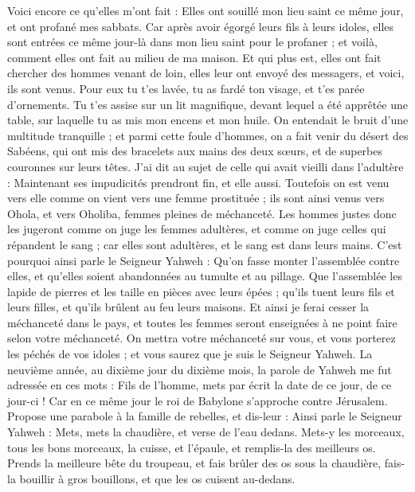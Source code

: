 \begin{multicols}{2}
Voici encore ce qu'elles m'ont fait : Elles ont souillé mon lieu saint ce même jour, et ont profané mes sabbats.
Car après avoir égorgé leurs fils à leurs idoles, elles sont entrées ce même jour-là dans mon lieu saint pour le profaner ; et voilà, comment elles ont fait au milieu de ma maison.
Et qui plus est, elles ont fait chercher des hommes venant de loin, elles leur ont envoyé des messagers, et voici, ils sont venus. Pour eux tu t'es lavée, tu as fardé ton visage, et t'es parée d'ornements.
Tu t'es assise sur un lit magnifique, devant lequel a été apprêtée une table, sur laquelle tu as mis mon encens et mon huile.
On entendait le bruit d’une multitude tranquille ; et parmi cette foule d’hommes, on a fait venir du désert des Sabéens, qui ont mis des bracelets aux mains des deux sœurs, et de superbes couronnes sur leurs têtes.
J'ai dit au sujet de celle qui avait vieilli dans l'adultère : Maintenant ses impudicités prendront fin, et elle aussi.
Toutefois on est venu vers elle comme on vient vers une femme prostituée ; ils sont ainsi venus vers Ohola, et vers Oholiba, femmes pleines de méchanceté.
Les hommes justes donc les jugeront comme on juge les femmes adultères, et comme on juge celles qui répandent le sang ; car elles sont adultères, et le sang est dans leurs mains.
C'est pourquoi ainsi parle le Seigneur Yahweh : Qu'on fasse monter l'assemblée contre elles, et qu'elles soient abandonnées au tumulte et au pillage.
Que l'assemblée les lapide de pierres et les taille en pièces avec leurs épées ; qu'ils tuent leurs fils et leurs filles, et qu'ils brûlent au feu leurs maisons.
Et ainsi je ferai cesser la méchanceté dans le pays, et toutes les femmes seront enseignées à ne point faire selon votre méchanceté.
On mettra votre méchanceté sur vous, et vous porterez les péchés de vos idoles ; et vous saurez que je suis le Seigneur Yahweh.
\VerseOne{}La neuvième année, au dixième jour du dixième mois, la parole de Yahweh me fut adressée en ces mots :
Fils de l’homme, mets par écrit la date de ce jour, de ce jour-ci ! Car en ce même jour le roi de Babylone s'approche contre Jérusalem.
Propose une parabole à la famille de rebelles, et dis-leur : Ainsi parle le Seigneur Yahweh : Mets, mets la chaudière, et verse de l'eau dedans.
Mets-y les morceaux, tous les bons morceaux, la cuisse, et l'épaule, et remplis-la des meilleurs os.
Prends la meilleure bête du troupeau, et fais brûler des os sous la chaudière, fais-la bouillir à gros bouillons, et que les os cuisent au-dedans.

\end{multicols}
